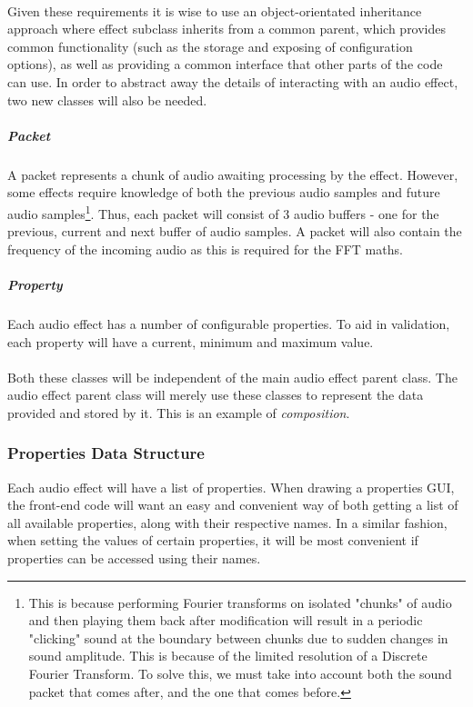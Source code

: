 \paragraph{}
Given these requirements it is wise to use an object-orientated inheritance approach where effect subclass inherits from a common parent, which provides common functionality (such as the storage and exposing of configuration options), as well as providing a common interface that other parts of the code can use. In order to abstract away the details of interacting with an audio effect, two new classes will also be needed.

\subparagraph{Packet} A packet represents a chunk of audio awaiting processing by the effect. However, some effects require knowledge of both the previous audio samples and future audio samples\footnote{
	This is because performing Fourier transforms on isolated "chunks" of audio and then
	playing them back after modification will result in a periodic "clicking" sound at the boundary between chunks due to sudden changes in sound amplitude. This is because
	of the limited resolution of a Discrete Fourier Transform. To solve this, we must take
	into account both the sound packet that comes after, and the one that comes before.
}. Thus, each packet will consist of 3 audio buffers - one for the previous, current and next buffer of audio samples. A packet will also contain the frequency of the incoming audio as this is required for the FFT maths.

\subparagraph{Property} Each audio effect has a number of configurable properties. To aid in validation, each property will have a current,  minimum and maximum value.

\paragraph{}
Both these classes will be independent of the main audio effect parent class. The audio effect parent class will merely use these classes to represent the data provided and stored by it. This is an example of {\it composition}.

\subsubsection{Properties Data Structure}
Each audio effect will have a list of properties. When drawing a properties GUI, the front-end code will want an easy and convenient way of both getting a list of all available properties, along with their respective names. In a similar fashion, when setting the values of certain properties, it will be most convenient if properties can be accessed using their names.

